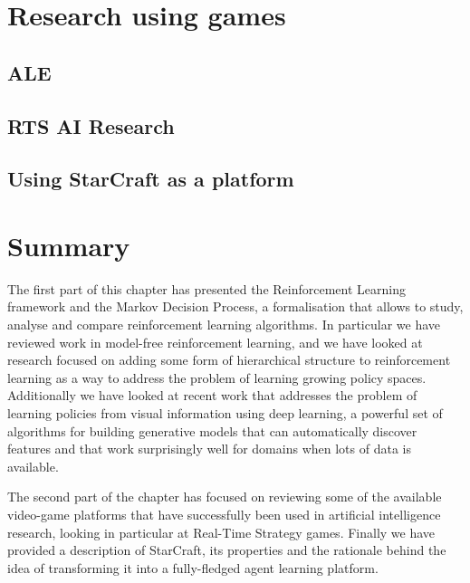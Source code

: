 \section{Research using games}

\subsection{ALE}

\subsection{RTS AI Research}

\subsection{Using StarCraft as a platform}

\section{Summary}

The first part of this chapter has presented the Reinforcement Learning
framework and the Markov Decision Process, a formalisation that allows to study,
analyse and compare reinforcement learning algorithms. In particular we have
reviewed work in model-free reinforcement learning, and we have looked at
research focused on adding some form of hierarchical structure to reinforcement
learning as a way to address the problem of learning growing policy spaces.
Additionally we have looked at recent work that addresses the problem of
learning policies from visual information using deep learning, a powerful set of
algorithms for building generative models that can automatically discover
features and that work surprisingly well for domains when lots of data is
available.

The second part of the chapter has focused on reviewing some of the available
video-game platforms that have successfully been used in artificial intelligence
research, looking in particular at Real-Time Strategy games. Finally we have
provided a description of StarCraft, its properties and the rationale behind the
idea of transforming it into a fully-fledged agent learning platform.
